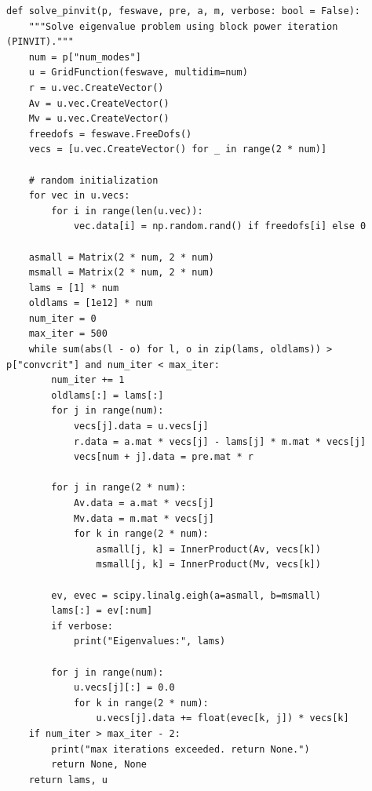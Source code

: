 \begin{verbatim}
def solve_pinvit(p, feswave, pre, a, m, verbose: bool = False):
    """Solve eigenvalue problem using block power iteration (PINVIT)."""
    num = p["num_modes"]
    u = GridFunction(feswave, multidim=num)
    r = u.vec.CreateVector()
    Av = u.vec.CreateVector()
    Mv = u.vec.CreateVector()
    freedofs = feswave.FreeDofs()
    vecs = [u.vec.CreateVector() for _ in range(2 * num)]

    # random initialization
    for vec in u.vecs:
        for i in range(len(u.vec)):
            vec.data[i] = np.random.rand() if freedofs[i] else 0

    asmall = Matrix(2 * num, 2 * num)
    msmall = Matrix(2 * num, 2 * num)
    lams = [1] * num
    oldlams = [1e12] * num
    num_iter = 0
    max_iter = 500
    while sum(abs(l - o) for l, o in zip(lams, oldlams)) > p["convcrit"] and num_iter < max_iter:
        num_iter += 1
        oldlams[:] = lams[:]
        for j in range(num):
            vecs[j].data = u.vecs[j]
            r.data = a.mat * vecs[j] - lams[j] * m.mat * vecs[j]
            vecs[num + j].data = pre.mat * r

        for j in range(2 * num):
            Av.data = a.mat * vecs[j]
            Mv.data = m.mat * vecs[j]
            for k in range(2 * num):
                asmall[j, k] = InnerProduct(Av, vecs[k])
                msmall[j, k] = InnerProduct(Mv, vecs[k])

        ev, evec = scipy.linalg.eigh(a=asmall, b=msmall)
        lams[:] = ev[:num]
        if verbose:
            print("Eigenvalues:", lams)

        for j in range(num):
            u.vecs[j][:] = 0.0
            for k in range(2 * num):
                u.vecs[j].data += float(evec[k, j]) * vecs[k]
    if num_iter > max_iter - 2:
        print("max iterations exceeded. return None.")
        return None, None
    return lams, u
\end{verbatim}
\clearpage
